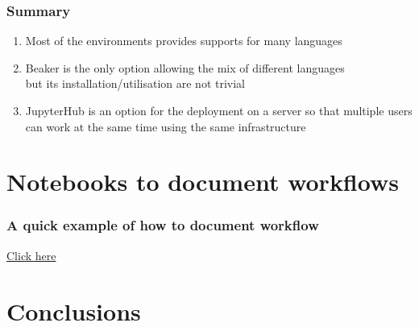 \begin{frame}[c]
\frametitle{Summary}

\begin{enumerate}

\item Most of the environments provides supports for many languages

\item Beaker is the only option allowing the mix of different languages\\
but its installation/utilisation are not trivial

\item ​JupyterHub is an option for the deployment on a server so that
multiple users can work at the same time using the same infrastructure
\end{enumerate}

\end{frame}



\section{Notebooks to document workflows}
\begin{frame}


\end{frame}

\begin{frame}[c]
\frametitle{A quick example of how to document workflow}

\href{./divand_example.slides.html}{Click here}
\end{frame}

\section{Conclusions}

